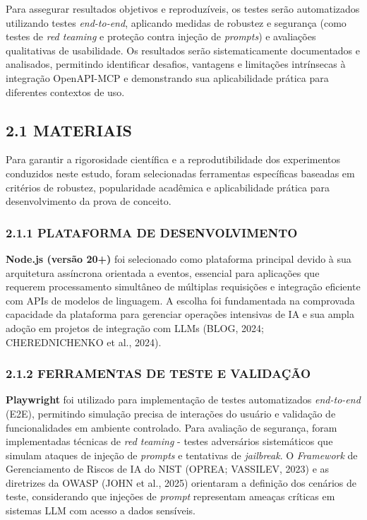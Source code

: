\documentclass[
]{article}
\begin{document}
Para assegurar resultados objetivos e reproduzíveis, os testes serão
automatizados utilizando testes \emph{end-to-end}, aplicando medidas de
robustez e segurança (como testes de \emph{red teaming} e proteção
contra injeção de \emph{prompts}) e avaliações qualitativas de
usabilidade. Os resultados serão sistematicamente documentados e
analisados, permitindo identificar desafios, vantagens e limitações
intrínsecas à integração OpenAPI-MCP e demonstrando sua aplicabilidade
prática para diferentes contextos de uso.

\subsection{2.1 MATERIAIS}\label{materiais}

Para garantir a rigorosidade científica e a reprodutibilidade dos
experimentos conduzidos neste estudo, foram selecionadas ferramentas
específicas baseadas em critérios de robustez, popularidade acadêmica e
aplicabilidade prática para desenvolvimento da prova de conceito.

\subsubsection{2.1.1 PLATAFORMA DE
DESENVOLVIMENTO}\label{plataforma-de-desenvolvimento}

\textbf{Node.js (versão 20+)} foi selecionado como plataforma principal
devido à sua arquitetura assíncrona orientada a eventos, essencial para
aplicações que requerem processamento simultâneo de múltiplas
requisições e integração eficiente com APIs de modelos de linguagem. A
escolha foi fundamentada na comprovada capacidade da plataforma para
gerenciar operações intensivas de IA e sua ampla adoção em projetos de
integração com LLMs (BLOG, 2024; CHEREDNICHENKO et al., 2024).

\subsubsection{2.1.2 FERRAMENTAS DE TESTE E
VALIDAÇÃO}\label{ferramentas-de-teste-e-validauxe7uxe3o}

\textbf{Playwright} foi utilizado para implementação de testes
automatizados \emph{end-to-end} (E2E), permitindo simulação precisa de
interações do usuário e validação de funcionalidades em ambiente
controlado. Para avaliação de segurança, foram implementadas técnicas de
\emph{red teaming} - testes adversários sistemáticos que simulam ataques
de injeção de \emph{prompts} e tentativas de \emph{jailbreak}. O
\emph{Framework} de Gerenciamento de Riscos de IA do NIST (OPREA;
VASSILEV, 2023) e as diretrizes da OWASP (JOHN et al., 2025) orientaram
a definição dos cenários de teste, considerando que injeções de
\emph{prompt} representam ameaças críticas em sistemas LLM com acesso a
dados sensíveis.
\end{document}
